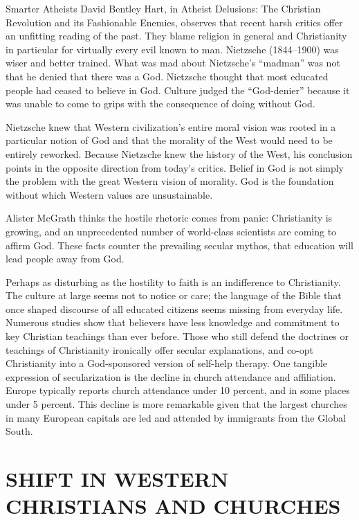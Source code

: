 \begin{sidebar}{Smarter Atheists}
David Bentley Hart, in Atheist Delusions: The Christian Revolution and its Fashionable Enemies,
observes that recent harsh critics offer an unfitting reading of the past. They blame religion in
general and Christianity in particular for virtually every evil known to man. Nietzsche (1844–1900)
was wiser and better trained. What was mad about Nietzsche’s “madman” was not that he denied that
there was a God. Nietzsche thought that most educated people had ceased to believe in God. Culture
judged the “God-denier” because it was unable to come to grips with the consequence of doing without
God.

Nietzsche knew that Western civilization’s entire moral vision was rooted in a particular notion of
God and that the morality of the West would need to be entirely reworked. Because Nietzsche knew the
history of the West, his conclusion points in the opposite direction from today’s critics. Belief in
God is not simply the problem with the great Western vision of morality. God is the foundation
without which Western values are unsustainable.

Alister McGrath thinks the hostile rhetoric comes from panic: Christianity is growing, and an
unprecedented number of world-class scientists are coming to affirm God. These facts counter the
prevailing secular mythos, that education will lead people away from God.
\end{sidebar}

Perhaps as disturbing as the hostility to faith is an indifference to Christianity. The culture at
large seems not to notice or care; the language of the Bible that once shaped discourse of all
educated citizens seems missing from everyday life. Numerous studies show that believers have less
knowledge and commitment to key Christian teachings than ever before. Those who still defend the
doctrines or teachings of Christianity ironically offer secular explanations, and co-opt
Christianity into a God-sponsored version of self-help therapy. One tangible expression of
secularization is the decline in church attendance and affiliation. Europe typically reports church
attendance under 10 percent, and in some places under 5 percent. This decline is more remarkable
given that the largest churches in many European capitals are led and attended by immigrants from
the Global South.

\section{SHIFT IN WESTERN CHRISTIANS AND CHURCHES}

